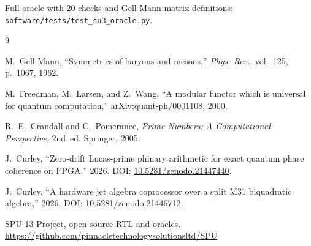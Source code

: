 \documentclass[conference]{IEEEtran}
\begin{document}
Full oracle with 20 checks and Gell-Mann matrix definitions:
\texttt{software/tests/test\_su3\_oracle.py}.

\begin{thebibliography}{9}

M.~Gell-Mann, ``Symmetries of baryons and mesons,''
\emph{Phys. Rev.}, vol.~125, p.~1067, 1962.

M.~Freedman, M.~Larsen, and Z.~Wang, ``A modular functor which is universal
for quantum computation,'' arXiv:quant-ph/0001108, 2000.

R.~E.~Crandall and C.~Pomerance, \emph{Prime Numbers: A Computational
Perspective}, 2nd~ed. Springer, 2005.

J.~Curley, ``Zero-drift Lucas-prime phinary arithmetic for exact quantum
phase coherence on FPGA,'' 2026. DOI:
\href{https://doi.org/10.5281/zenodo.21447440}{10.5281/zenodo.21447440}.

J.~Curley, ``A hardware jet algebra coprocessor over a split M31
biquadratic algebra,'' 2026. DOI:
\href{https://doi.org/10.5281/zenodo.21446712}{10.5281/zenodo.21446712}.

SPU-13 Project, open-source RTL and oracles.
\url{https://github.com/pinnacletechnologysolutionsltd/SPU}

\end{thebibliography}
\end{document}
